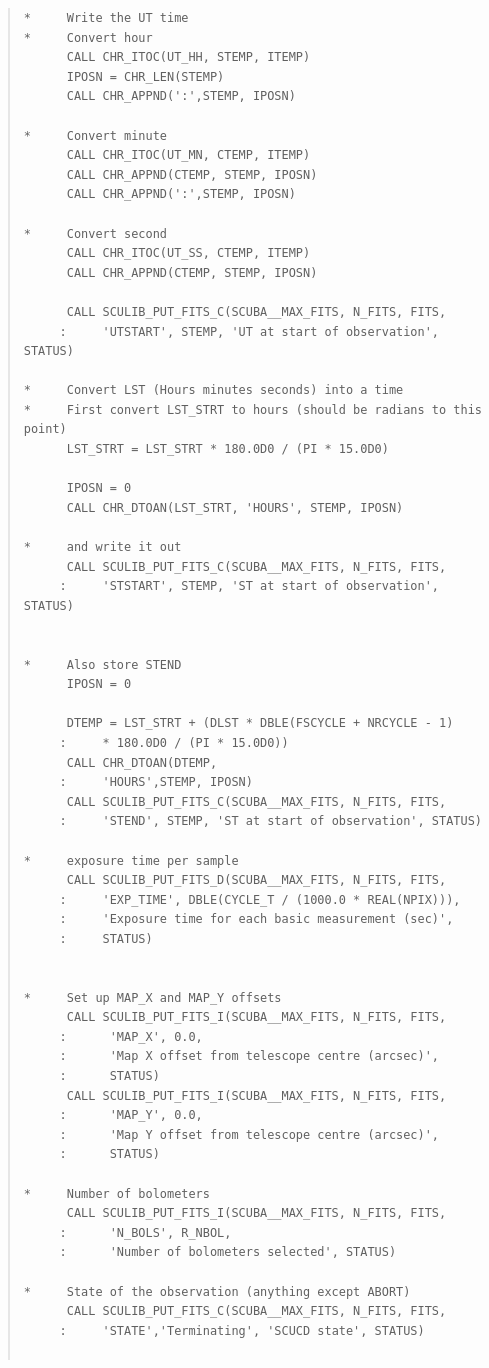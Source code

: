 \documentclass[twoside,11pt]{article}
\newenvironment{myquote}{\begin{quote}\begin{small}}{\end{small}\end{quote}}
\renewcommand{\_}{\texttt{\symbol{95}}}
\begin{document}
\begin{myquote}
\begin{verbatim}
*     Write the UT time
*     Convert hour
      CALL CHR_ITOC(UT_HH, STEMP, ITEMP)
      IPOSN = CHR_LEN(STEMP)
      CALL CHR_APPND(':',STEMP, IPOSN)

*     Convert minute
      CALL CHR_ITOC(UT_MN, CTEMP, ITEMP)
      CALL CHR_APPND(CTEMP, STEMP, IPOSN)
      CALL CHR_APPND(':',STEMP, IPOSN)

*     Convert second
      CALL CHR_ITOC(UT_SS, CTEMP, ITEMP)
      CALL CHR_APPND(CTEMP, STEMP, IPOSN)

      CALL SCULIB_PUT_FITS_C(SCUBA__MAX_FITS, N_FITS, FITS,
     :     'UTSTART', STEMP, 'UT at start of observation', STATUS)

*     Convert LST (Hours minutes seconds) into a time
*     First convert LST_STRT to hours (should be radians to this point)
      LST_STRT = LST_STRT * 180.0D0 / (PI * 15.0D0)

      IPOSN = 0
      CALL CHR_DTOAN(LST_STRT, 'HOURS', STEMP, IPOSN)

*     and write it out
      CALL SCULIB_PUT_FITS_C(SCUBA__MAX_FITS, N_FITS, FITS,
     :     'STSTART', STEMP, 'ST at start of observation', STATUS)


*     Also store STEND
      IPOSN = 0

      DTEMP = LST_STRT + (DLST * DBLE(FSCYCLE + NRCYCLE - 1)
     :     * 180.0D0 / (PI * 15.0D0))
      CALL CHR_DTOAN(DTEMP,
     :     'HOURS',STEMP, IPOSN)
      CALL SCULIB_PUT_FITS_C(SCUBA__MAX_FITS, N_FITS, FITS,
     :     'STEND', STEMP, 'ST at start of observation', STATUS)

*     exposure time per sample
      CALL SCULIB_PUT_FITS_D(SCUBA__MAX_FITS, N_FITS, FITS,
     :     'EXP_TIME', DBLE(CYCLE_T / (1000.0 * REAL(NPIX))),
     :     'Exposure time for each basic measurement (sec)',
     :     STATUS)


*     Set up MAP_X and MAP_Y offsets
      CALL SCULIB_PUT_FITS_I(SCUBA__MAX_FITS, N_FITS, FITS,
     :      'MAP_X', 0.0,
     :      'Map X offset from telescope centre (arcsec)',
     :      STATUS)
      CALL SCULIB_PUT_FITS_I(SCUBA__MAX_FITS, N_FITS, FITS,
     :      'MAP_Y', 0.0,
     :      'Map Y offset from telescope centre (arcsec)',
     :      STATUS)

*     Number of bolometers
      CALL SCULIB_PUT_FITS_I(SCUBA__MAX_FITS, N_FITS, FITS,
     :      'N_BOLS', R_NBOL,
     :      'Number of bolometers selected', STATUS)

*     State of the observation (anything except ABORT)
      CALL SCULIB_PUT_FITS_C(SCUBA__MAX_FITS, N_FITS, FITS,
     :     'STATE','Terminating', 'SCUCD state', STATUS)


\end{verbatim}
\end{myquote}
\end{document}

